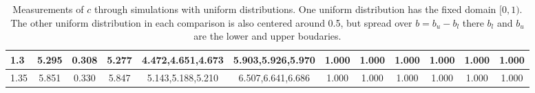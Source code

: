 \begin{table*}[h!]
\begin{center}
\begin{tabular}{| l | c | c | c | c | c | c | c | c | c | c | c |}
1.3 & 5.295 & 0.308 & 5.277 & 4.472,4.651,4.673 & 5.903,5.926,5.970  & 1.000  & 1.000  & 1.000  & 1.000  & 1.000  & 1.000 \\\hline
1.35 & 5.851 & 0.330 & 5.847 & 5.143,5.188,5.210 & 6.507,6.641,6.686  & 1.000  & 1.000  & 1.000  & 1.000  & 1.000  & 1.000 \\\hline
\end{tabular}
\caption{Measurements of $c$ through simulations
        with uniform distributions.
        One uniform distribution has the fixed domain $[0,1)$.
        The other uniform distribution in each comparison
        is also centered around 0.5,
        but spread over $b=b_u-b_l$ there $b_l$ and $b_u$ are the lower and upper boudaries.}
\end{center}
\end{table*}